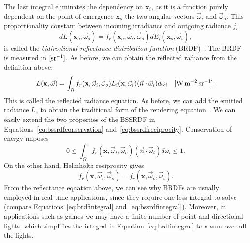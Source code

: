 The last integral eliminates the dependency on $\mathbf{x}_i$, as it is a function purely dependent on the point of emergence $\mathbf{x}_o$ the two angular vectors $\vec{\omega}_i$ and $\vec{\omega}_o$. This proportionality constant between incoming irradiance and outgoing radiance $f_r$
\begin{equation}
\label{eq:brdf}
d L(\mathbf{x}_o, \vec{\omega}_o) = f_r(\mathbf{x}_o, \vec{\omega}_i, \vec{\omega}_o) d E_i(\mathbf{x}_o, \vec{\omega}_i),
\end{equation}
is called the \emph{bidirectional reflectance distribution function} (BRDF)~\cite{Nicodemus1977}. The BRDF is measured in $\siunitnospace{\per \steradian}$. As before, we can obtain the reflected radiance from the definition above:
\begin{equation}
\label{eq:brdfintegral}
L(\mathbf{x}, \vec{\omega}) = \int_\Omega f_r(\mathbf{x}, \vec{\omega}_i,  \vec{\omega}_o) L_i(\mathbf{x}, \vec{\omega}_i) (\vec{n} \cdot \vec{\omega}_i) d{\omega}_i  \siunit{\watt \per \square \metre \per \steradian}.
\end{equation}
This is called the reflected radiance equation. As before, we can add the emitted radiance $L_e$ to obtain the traditional form of the rendering equation~\cite{Kajiya1986}. We can easily extend the two properties of the BSSRDF in Equations~\ref{eq:bssrdfconservation} and~\ref{eq:bssrdfreciprocity}. Conservation of energy imposes
\begin{equation*}
0 \leq \int_\Omega f_r(\mathbf{x}, \vec{\omega}_i,  \vec{\omega}_o)  (\vec{n} \cdot \vec{\omega}_i) d{\omega}_i \leq 1.
\end{equation*}
On the other hand, Helmholtz reciprocity gives
\begin{equation*}
f_r(\mathbf{x}, \vec{\omega}_i,  \vec{\omega}_o) = f_r(\mathbf{x}, \vec{\omega}_o,  \vec{\omega}_i).
\end{equation*}
From the reflectance equation above, we can see why BRDFs are usually employed in real time applications, since they require one less integral to solve (compare Equations~\ref{eq:brdfintegral} and~\ref{eq:bssrdfintegral}). Moreover, in applications such as games we may have a finite number of point and directional lights, which simplifies the integral in Equation~\ref{eq:brdfintegral} to a sum over all the lights.

